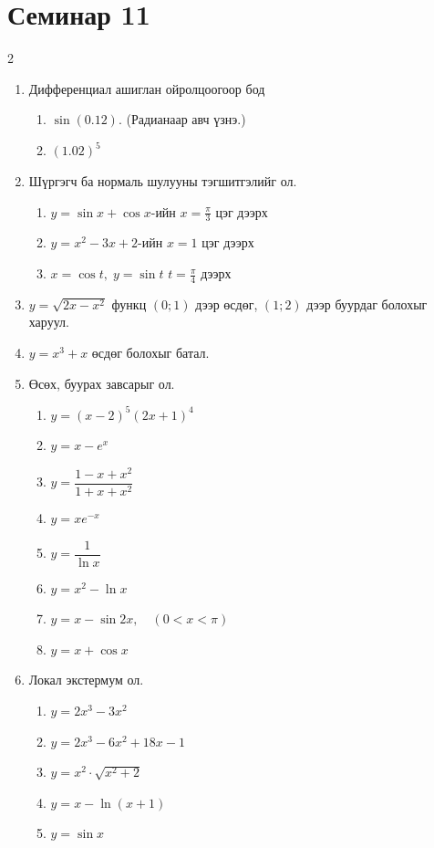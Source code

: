 \section{Семинар 11}
\begin{multicols}{2}
\begin{enumerate}
  \item Дифференциал ашиглан ойролцоогоор бод
  \begin{enumerate}
  \item  \(\sin(0.12)\). (Радианаар авч үзнэ.)
  \item \((1.02)^5\)
\end{enumerate}
  \item Шүргэгч ба нормаль шулууны тэгшитгэлийг ол.    
  \begin{enumerate}
      \item \(y=\sin x+\cos x\)-ийн \(x=\tfrac{\pi}{3}\) цэг дээрх 
  \item \(y=x^2-3x+2\)-ийн \(x=1\) цэг дээрх 
  \item  \(x=\cos t,\; y=\sin t\) \(t=\tfrac{\pi}{4}\) дээрх
  \end{enumerate}
    \item $y=\sqrt{2x-x^2}$ функц $(0;1)$  дээр өсдөг, $(1;2)$ дээр буурдаг болохыг харуул.
    \item $y=x^3+x$ өсдөг болохыг батал.
    \item Өсөх, буурах завсарыг ол.
    \begin{enumerate}
        \item $y=(x-2)^5(2x+1)^4$
        \item $y=x-e^x$
        \item $y=\dfrac{1-x+x^2}{1+x+x^2}$
        \item $y=xe^{-x}$
        \item $y=\dfrac{1}{\ln x}$
        \item $y=x^2-\ln x$
        \item $y=x-\sin 2x,\quad (0<x<\pi)$
        \item $y=x+\cos x$
    \end{enumerate}
    \item Локал экстермум ол.
    \begin{enumerate}
        \item $y=2x^3-3x^2$
        \item $y=2x^3-6x^2+18x-1$
        \item $y=x^2\cdot \sqrt{x^2+2}$
        \item $y=x-\ln (x+1)$
        \item $y=\sin x$

\end{enumerate}
\end{enumerate}
\end{multicols}
